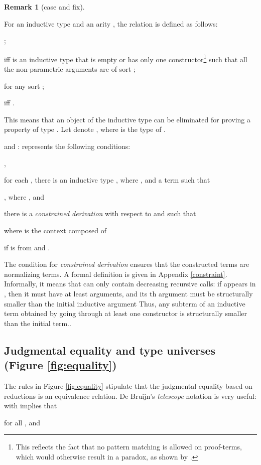 \documentclass{LMCS}
\theoremstyle{plain}
\theoremstyle{definition}
\newtheorem{remm}[thm]{Remark}
\begin{document}
\begin{remm}[\textsf{case} and \textsf{fix}]
\begin{enumerate}[(1)]
For an inductive type  and an arity , the relation  is defined as follows:
    \begin{iteMize}{}
    \item ;
   \item  iff  is an inductive type that is empty or has only one constructor\footnote{This reflects the fact that no pattern matching is allowed on proof-terms, which would otherwise result in a paradox, as shown by \cite{coquand-meta}.}
    such that all the non-parametric arguments are of sort ;
    \item  for any sort ;
    \item  iff .
    \end{iteMize}
This means that an object of the inductive type  can be eliminated for proving a property  of type . Let  denote , where  is the type of .\medskip

\noindent  and :
 represents the following conditions:
\begin{iteMize}{}
\item ,



\item for each , there is an inductive type , where , and a term  such that 
  \begin{iteMize}{}
  \item , where , and
    
  \item there is a \emph{constrained derivation} with respect to  and  such that
    
    where  is the context composed of
    
    if  is from   and .\medskip
  \end{iteMize}
  
  The condition for \emph{constrained derivation} ensures that the constructed terms are normalizing terms. A formal definition is given in Appendix \ref{constraint}. Informally, it means that  can only contain decreasing recursive calls: if  appears in , then it must have at least  arguments, and its th argument must be structurally smaller than the initial inductive argument  Thus, any subterm of an inductive term obtained by going through at least one constructor is structurally smaller than the initial term..
\end{iteMize}


\subsection*{Judgmental equality and type universes (Figure \ref{fig:equality})}
The rules in Figure \ref{fig:equality} stipulate that the judgmental equality based on reductions is an equivalence relation. De Bruijn's {\it telescope} notation is very useful:  with  implies that
\begin{iteMize}{}
\item  for all , and


\end{iteMize}
\end{enumerate}
\end{remm}
\end{document}
